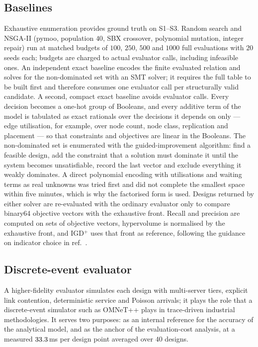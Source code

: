 \subsection{Baselines}
Exhaustive enumeration provides ground truth on S1--S3. Random search and
NSGA-II\cite{deb2002nsga2} (pymoo\cite{blank2020pymoo}, population $40$, SBX crossover,
polynomial mutation, integer repair) run at matched budgets of $100$, $250$, $500$ and
$1000$ full evaluations with $20$ seeds each; budgets are charged to actual evaluator
calls, including infeasible ones. An independent exact baseline encodes the finite
evaluated relation and solves for the non-dominated set with an SMT
solver\cite{demoura2008z3}; it requires the full table to be built first and therefore
consumes one evaluator call per structurally valid candidate. A second, compact exact
baseline avoids evaluator calls. Every decision becomes a one-hot group of Booleans, and
every additive term of the model is tabulated as exact rationals over the decisions it
depends on only --- edge utilisation, for example, over node count, node class,
replication and placement --- so that constraints and objectives are linear in the
Booleans. The non-dominated set is enumerated with the guided-improvement algorithm: find
a feasible design, add the constraint that a solution must dominate it until the system
becomes unsatisfiable, record the last vector and exclude everything it weakly dominates.
A direct polynomial encoding with utilisations and waiting terms as real unknowns was
tried first and did not complete the smallest space within five minutes, which is why the
factorised form is used. Designs returned by either solver are re-evaluated with the
ordinary evaluator only to compare binary64 objective vectors with the exhaustive front.
Recall and precision are
computed on sets of objective vectors, hypervolume\cite{zitzler1999hv} is normalised by
the exhaustive front, and IGD$^{+}$\cite{ishibuchi2015igdplus} uses that front as
reference, following the guidance on indicator choice in ref.~.

\subsection{Discrete-event evaluator}
A higher-fidelity evaluator simulates each design with multi-server tiers, explicit link
contention, deterministic service and Poisson arrivals; it plays the role that a
discrete-event simulator such as OMNeT++\cite{varga2008omnet} plays in trace-driven
industrial methodologies\cite{saadatmand2025compdse}. It serves two purposes: as an
internal reference for the accuracy of the analytical model, and as the anchor of the
evaluation-cost analysis, at a measured $33.3$\,ms per design point averaged over
$40$ designs.

